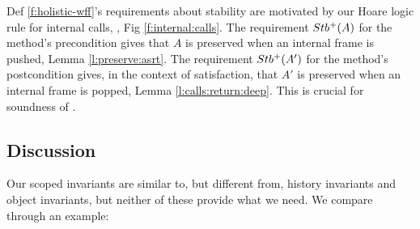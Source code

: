 {Def \ref{f:holistic-wff}'s  requirements about stability are motivated by our Hoare logic rule for internal calls,   {}, Fig \ref{f:internal:calls}. The requirement    ${Stb^+( A )}$ for the method's precondition  gives that $A$ is preserved when an internal frame is pushed, \cf Lemma \ref{l:preserve:asrt}.
The requirement     ${Stb^+( A' )}$ for the method's postcondition gives,  in the context of \strong satisfaction,  that $A'$ is preserved when an internal frame is popped, \cf Lemma \ref{l:calls:return:deep}. This is crucial for soundness of  {}.




\subsection{\textbf{Discussion}}  

  Our scoped invariants are similar to, but different from, history invariants  and object invariants, but
neither of these provide what we need. 
We compare through an example:

\vspace{-.35cm}
 
}
